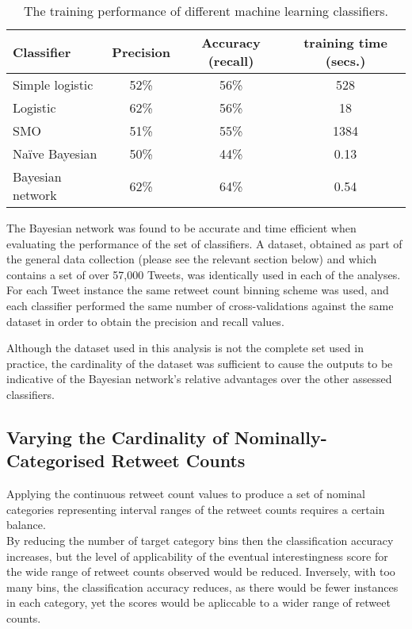 \begin{table}[h]\footnotesize
\begin{center}
\begin{tabular}{ l | c | c | c }
	Classifier	& Precision & Accuracy (recall) &  training time (secs.) \\
	\hline
	\hline 
	Simple logistic & 52\% &  56\% & 528\\
    Logistic        & 62\% &  56\% & 18\\
    SMO             & 51\% &  55\% & 1384\\
    Na\"{i}ve Bayesian & 50\% & 44\% & 0.13\\
    Bayesian network & 62\%&  64\% & 0.54\\
    \hline  
\end{tabular}
\end{center}
\caption{The training performance of different machine learning classifiers.}
\label{table:classifierperformance}
\end{table}

The Bayesian network was found to be accurate and time efficient when evaluating the performance of the set of classifiers. A dataset, obtained as part of the general data collection (please see the relevant section below) and which contains a set of over 57,000 Tweets, was identically used in each of the analyses. For each Tweet instance the same retweet count binning scheme was used, and each classifier performed the same number of cross-validations against the same dataset in order to obtain the precision and recall values.

Although the dataset used in this analysis is not the complete set used in practice, the cardinality of the dataset was sufficient to cause the outputs to be indicative of the Bayesian network's relative advantages over the other assessed classifiers.


\subsection{Varying the Cardinality of Nominally-Categorised Retweet Counts}
Applying the continuous retweet count values to produce a set of nominal categories representing interval ranges of the retweet counts requires a certain balance.\\
By reducing the number of target category bins then the classification accuracy increases, but the level of applicability of the eventual interestingness score for the wide range of retweet counts observed would be reduced. Inversely, with too many bins, the classification accuracy reduces, as there would be fewer instances in each category, yet the scores would be apliccable to a wider range of retweet counts.

